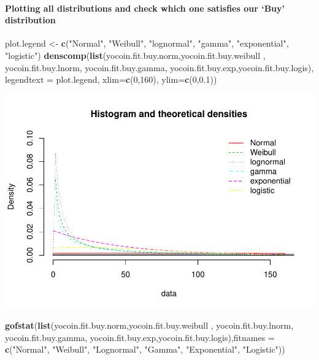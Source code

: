 \documentclass[]{article}
\newenvironment{Shaded}{\begin{snugshade}}{\end{snugshade}}
\newcommand{\KeywordTok}[1]{\textcolor[rgb]{0.13,0.29,0.53}{\textbf{#1}}}
\newcommand{\DataTypeTok}[1]{\textcolor[rgb]{0.13,0.29,0.53}{#1}}
\newcommand{\DecValTok}[1]{\textcolor[rgb]{0.00,0.00,0.81}{#1}}
\newcommand{\FloatTok}[1]{\textcolor[rgb]{0.00,0.00,0.81}{#1}}
\newcommand{\StringTok}[1]{\textcolor[rgb]{0.31,0.60,0.02}{#1}}
\newcommand{\NormalTok}[1]{#1}
\let\oldparagraph\paragraph
\renewcommand{\paragraph}[1]{\oldparagraph{#1}\mbox{}}
\begin{document}
\paragraph{\texorpdfstring{Plotting all distributions and check which
one satisfies our `Buy'
distribution}{Plotting all distributions and check which one satisfies our Buy distribution}}\label{plotting-all-distributions-and-check-which-one-satisfies-our-buy-distribution-1}

\begin{Shaded}
\begin{Highlighting}[]
\NormalTok{plot.legend <-}\StringTok{ }\KeywordTok{c}\NormalTok{(}\StringTok{"Normal"}\NormalTok{, }\StringTok{"Weibull"}\NormalTok{, }\StringTok{"lognormal"}\NormalTok{, }\StringTok{"gamma"}\NormalTok{, }\StringTok{"exponential"}\NormalTok{, }\StringTok{"logistic"}\NormalTok{)}
\KeywordTok{denscomp}\NormalTok{(}\KeywordTok{list}\NormalTok{(yocoin.fit.buy.norm,yocoin.fit.buy.weibull , yocoin.fit.buy.lnorm, yocoin.fit.buy.gamma, yocoin.fit.buy.exp,yocoin.fit.buy.logis), }\DataTypeTok{legendtext =}\NormalTok{ plot.legend, }\DataTypeTok{xlim=}\KeywordTok{c}\NormalTok{(}\DecValTok{0}\NormalTok{,}\DecValTok{160}\NormalTok{), }\DataTypeTok{ylim=}\KeywordTok{c}\NormalTok{(}\DecValTok{0}\NormalTok{,}\FloatTok{0.1}\NormalTok{))}
\end{Highlighting}
\end{Shaded}

\includegraphics{analysis_files/figure-latex/unnamed-chunk-33-1.pdf}

\begin{Shaded}
\begin{Highlighting}[]
\KeywordTok{gofstat}\NormalTok{(}\KeywordTok{list}\NormalTok{(yocoin.fit.buy.norm,yocoin.fit.buy.weibull , yocoin.fit.buy.lnorm, yocoin.fit.buy.gamma, yocoin.fit.buy.exp,yocoin.fit.buy.logis),}\DataTypeTok{fitnames =} \KeywordTok{c}\NormalTok{(}\StringTok{"Normal"}\NormalTok{, }\StringTok{"Weibull"}\NormalTok{, }\StringTok{"Lognormal"}\NormalTok{, }\StringTok{"Gamma"}\NormalTok{, }\StringTok{"Exponential"}\NormalTok{, }\StringTok{"Logistic"}\NormalTok{))}
\end{Highlighting}
\end{Shaded}
\end{document}

